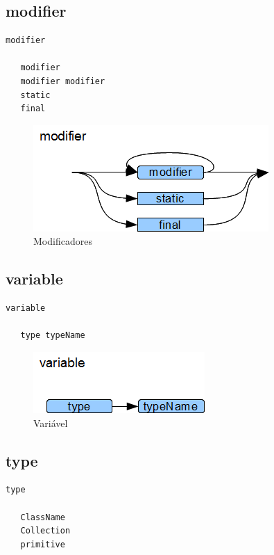 \subsection{modifier}

\begin{lstlisting}
modifier

   modifier
   modifier modifier
   static
   final

\end{lstlisting}

\begin{figure}[h!]
 \centering
 \includegraphics{capitulo09/modifier.png}
 \caption{Modificadores}
\end{figure}
\subsection{variable}

\begin{lstlisting}
variable

   type typeName

\end{lstlisting}

\begin{figure}[h!]
 \centering
 \includegraphics{capitulo09/variable.png}
 \caption{Variável}
\end{figure}
\subsection{type}

\begin{lstlisting}
type

   ClassName
   Collection
   primitive

\end{lstlisting}

